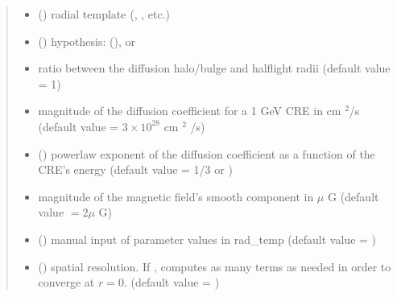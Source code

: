 \documentclass[letterpaper,10pt,english]{sphinxmanual}
\begin{document}
\begin{fulllineitems}
\begin{quote}
\begin{description}
\begin{itemize}
\item {} 
\sphinxAtStartPar
{} () \textendash{} radial template (, , etc.)

\item {} 
\sphinxAtStartPar
{} () \textendash{} hypothesis:  (),  or 

\item {} 
\sphinxAtStartPar
{} \textendash{} ratio between the diffusion halo/bulge and half\sphinxhyphen{}light radii (default value = 1)

\item {} 
\sphinxAtStartPar
{} \textendash{} magnitude of the diffusion coefficient for a 1 GeV CRE in cm \({}^2\)/s (default value = \(3\times 10^{28}\) cm \({}^2\) /s)

\item {} 
\sphinxAtStartPar
{} (\sphinxstyleliteralemphasis{\sphinxupquote{, }}) \textendash{} power\sphinxhyphen{}law exponent of the diffusion coefficient as a function of the CRE’s energy (default value = 1/3 or )

\item {} 
\sphinxAtStartPar
{} \textendash{} magnitude of the magnetic field’s smooth component in \(\mu\) G (default value \(= 2 \mu\) G)

\item {} 
\sphinxAtStartPar
{} () \textendash{} manual input of parameter values in rad\_temp (default value = )

\item {} 
\sphinxAtStartPar
{} () \textendash{} spatial resolution. If , {\hyperref[\detokenize{diffsph:diffsph.pyflux.synch_emissivity}]{}} computes as many terms as needed in order to converge at \(r=0\). (default value = )


\end{itemize}
\end{description}
\end{quote}
\end{fulllineitems}
\end{document}
